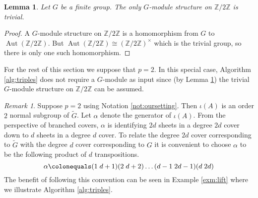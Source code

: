 \documentclass{dcthesis}
\newcommand{\ZZ}{\mathbb Z}
\newcommand{\mm}[1]{{\color{blue} \sf MM: [#1]}}
\newcommand{\wt}[1]{\widetilde{#1}}
\DeclareMathOperator{\Aut}{Aut}
\numberwithin{equation}{section}
\newtheorem{lemma}[equation]{Lemma}
\theoremstyle{definition}
\theoremstyle{remark}
\newtheorem{remark}[equation]{Remark}
\begin{document}
{{{\begin{lemma}
      \label{lem:trivialGmoduleonly}
      Let $G$ be a finite group.
      The only $G$-module structure on
      $\ZZ/2\ZZ$ is trivial.
    \end{lemma}
    \begin{proof}
      A $G$-module structure on $\ZZ/2\ZZ$
      is a homomorphism
      from $G$ to $\Aut(\ZZ/2\ZZ)$.
      But $\Aut(\ZZ/2\ZZ)\cong(\ZZ/2\ZZ)^\times$
      which is the trivial group,
      so there is only one such
      homomorphism.
    \end{proof}
    For the rest of this section we suppose
    that $p=2$.
    In this special case,
    Algorithm
    \ref{alg:triples}
    does not require
    a $G$-module as input
    since
    (by Lemma
    \ref{lem:trivialGmoduleonly})
    the trivial $G$-module structure
    on $\ZZ/2\ZZ$ can be assumed.
    \begin{remark}
      \label{rmk:distinguishedinvolution}
      Suppose $p=2$ using Notation
      \ref{not:oursetting}.
      Then $\iota(A)$ is an
      order $2$ normal subgroup of $\wt{G}$.
      Let $\alpha$ denote the generator of
      $\iota(A)$.
      From the perspective of branched covers,
      $\alpha$ is identifying $2d$ sheets
      in a degree $2d$ cover down to $d$ sheets
      in a degree $d$ cover.
      To relate the degree $2d$ cover
      corresponding to $\wt{G}$
      with the
      degree $d$ cover
      corresponding to $G$
      it is convenient to choose $\alpha$
      to be the following product of $d$
      transpositions.
      \begin{equation}
        \label{eqn:alpha}
        \alpha\colonequals
        (1\;d+1)(2\;d+2)\dots
        (d-1\;2d-1)(d\;2d)
      \end{equation}
      The benefit of following this convention
      can be seen in Example
      \ref{exm:lift}
      where we
      illustrate Algorithm \ref{alg:triples}.
    \end{remark}
}}}
\end{document}
